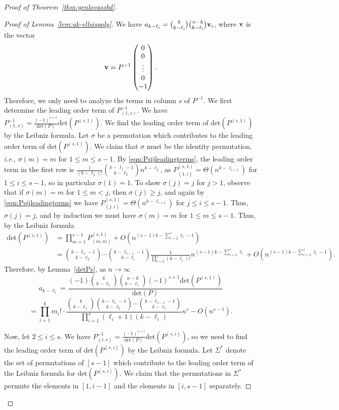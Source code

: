 \documentclass[11pt]{article}
\theoremstyle{definition}
\theoremstyle{remark}
\begin{document}
\begin{proof}[Proof of Theorem~\ref{thm:genlovaszbd}]
\begin{proof}[Proof of Lemma~\ref{lem:ak-ellsispoly}]
We have $a_{k-\ell_i} = \binom{k}{k-\ell_i}\binom{n-k}{k-\ell_i}{\bf v}_i$, where ${\bf v}$ is the vector \[{\bf v} = P^{-1}\begin{pmatrix}0 \\ 0 \\ \vdots \\ 0 \\ -1\end{pmatrix}.\]
Therefore, we only need to analyze the terms in column $s$ of $P^{-1}$.  We first determine the leading order term of $P_{(1, s)}^{-1}$. We have $P_{(1, s)}^{-1} = \frac{(-1)^{s+1}}{\text{det}(P)}\text{det}(P^{(s, 1)})$. We find the leading order term of $\text{det}(P^{(s, 1)})$ by the Leibniz formula. Let $\sigma$ be a permutation which contributes to the leading order term of  $\text{det}(P^{(s, 1)})$. We claim that $\sigma$ must be the identity permutation, \textit{i.e.}, $\sigma(m) = m$ for $1\le m\le s-1$. By \eqref{eqn:Psijleadingterms}, the leading order term in the first row is $\frac{1}{(k-\ell_2)!}\binom{k-\ell_1-1}{k-\ell_2}n^{k-\ell_2}$, as $P_{(1, i)}^{(s, 1)} = \Theta(n^{k-\ell_{i+1}})$ for $1\le i\le s-1$, so in particular $\sigma(1) = 1$. To show $\sigma(j) = j$ for $j > 1$, observe that if $\sigma(m) = m$ for $1\le m < j$, then $\sigma(j) \ge j$, and again by \eqref{eqn:Psijleadingterms}  we have $P_{(j, i)}^{(s, 1)} = \Theta(n^{k-\ell_{i+1}})$ for $j\le i\le s-1$. Thus, $\sigma(j) = j$, and by induction we must have $\sigma(m) = m$ for $1\le m\le s-1$. Thus, by the Leibniz formula
\begin{align*}
\text{det}(P^{(s, 1)})&= \prod_{m=1}^{s-1}P_{(m, m)}^{(s, 1)}  + O(n^{(s-1)k-\sum_{i=2}^s\ell_i-1})\\
& = \binom{k-\ell_1-1}{k-\ell_2}\cdots\binom{k-\ell_{s-1}-1}{k-\ell_s}\frac{1}{\prod_{i=2}^s(k-\ell_i)!}n^{(s-1)k-\sum_{i=2}^s\ell_i} + O(n^{(s-1)k-\sum_{i=2}^s\ell_i-1}).
\end{align*}
Therefore, by Lemma~\ref{detPs}, as $n\rightarrow \infty$
\[a_{k-\ell_1} = \frac{(-1)\binom{k}{k-\ell_1}\binom{n-k}{k-\ell_1}(-1)^{s+1}\text{det}(P^{(s, 1)})}{\text{det}(P)} \]
\[ = \prod_{i=1}^{b}m_i!\cdot\frac{\binom{k}{k-\ell_1}\binom{k-\ell_1-1}{k-\ell_2}\cdots \binom{k-\ell_{s-1}-1}{k-\ell_s}}{\prod_{i=1}^s(\ell_i+1)(k-\ell_i)}n^{s} - O(n^{s-1}).\]

Now, let $2\le i\le s$. We have $P_{(i, s)}^{-1} = \frac{(-1)^{s+i}}{\text{det}(P)}\text{det}(P^{(s, i)})$, so we need to find the leading order term of $\text{det}(P^{(s, i)})$ by the Leibniz formula.
Let $\Sigma^*$ denote the set of permutations of $[s-1]$ which contribute to the leading order term of the Leibniz formula for $\text{det}(P^{(s, i)})$. We claim that the permutations in $\Sigma^*$ permute the elements in $[1, i-1]$ and the elements in $[i, s-1]$ separately.  


\end{proof}
\end{proof}
\end{document}
